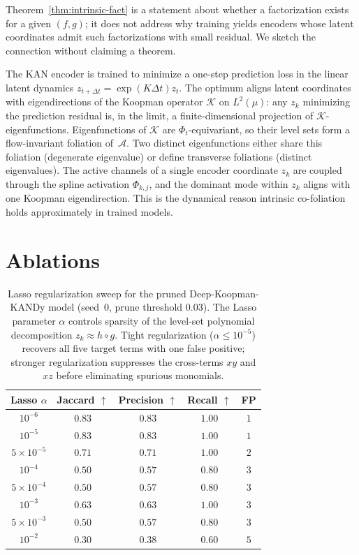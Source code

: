 \documentclass{article}
\begin{document}
Theorem~\ref{thm:intrinsic-fact} is a statement about whether a
factorization exists for a given $(f,g)$; it does not address why training
yields encoders whose latent coordinates admit such factorizations with
small residual. We sketch the connection without claiming a theorem.

The KAN encoder is trained to minimize a one-step prediction loss in the
linear latent dynamics $z_{t+\Delta t} = \exp(K\Delta t)z_t$. The
optimum aligns latent coordinates with eigendirections of the Koopman
operator $\mathcal{K}$ on $L^2(\mu)$: any $z_k$ minimizing the
prediction residual is, in the limit, a finite-dimensional projection of
$\mathcal{K}$-eigenfunctions. Eigenfunctions of $\mathcal{K}$ are
$\Phi_t$-equivariant, so their level sets form a flow-invariant
foliation of~$\mathcal{A}$. Two distinct eigenfunctions either share
this foliation (degenerate eigenvalue) or define transverse foliations
(distinct eigenvalues). The active channels of a single encoder
coordinate $z_k$ are coupled through the spline activation $\Phi_{k,j}$,
and the dominant mode within $z_k$ aligns with one Koopman eigendirection.
This is the dynamical reason intrinsic co-foliation holds approximately
in trained models. 


\newpage
\section{Ablations}

\begin{table}[ht]
\centering
\begin{tabular}{@{}ccccc@{}}
\toprule
Lasso $\alpha$ & Jaccard $\uparrow$ & Precision $\uparrow$ & Recall $\uparrow$ & FP \\
\midrule
$10^{-6}$ & $\mathbf{0.83}$ & $\mathbf{0.83}$ & $\mathbf{1.00}$ & $1$ \\
$10^{-5}$ & $\mathbf{0.83}$ & $\mathbf{0.83}$ & $\mathbf{1.00}$ & $1$ \\
$5\!\times\!10^{-5}$ & $0.71$ & $0.71$ & $\mathbf{1.00}$ & $2$ \\
$10^{-4}$ & $0.50$ & $0.57$ & $0.80$ & $3$ \\
$5\!\times\!10^{-4}$ & $0.50$ & $0.57$ & $0.80$ & $3$ \\
$10^{-3}$ & $0.63$ & $0.63$ & $\mathbf{1.00}$ & $3$ \\
$5\!\times\!10^{-3}$ & $0.50$ & $0.57$ & $0.80$ & $3$ \\
$10^{-2}$ & $0.30$ & $0.38$ & $0.60$ & $5$ \\
\bottomrule
\end{tabular}
\caption{Lasso regularization sweep for the pruned Deep-Koopman-KANDy model (seed~0, prune threshold $0.03$). The Lasso parameter $\alpha$ controls sparsity of the level-set polynomial decomposition $z_k \approx h \circ g$. Tight regularization ($\alpha \leq 10^{-5}$) recovers all five target terms with one false positive; stronger regularization suppresses the cross-terms $xy$ and $xz$ before eliminating spurious monomials.}
\label{tab:lasso-sweep}
\end{table}
\end{document}
